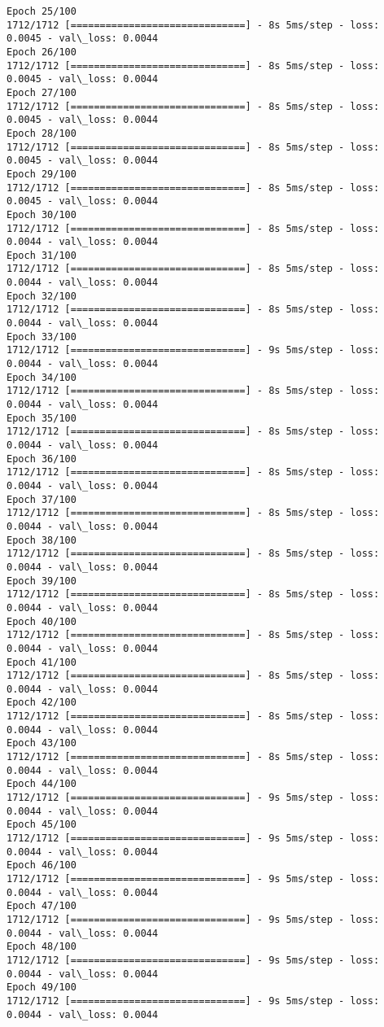 \documentclass[11pt]{article}
\begin{document}
\begin{Verbatim}[commandchars=\\\{\}]
Epoch 25/100
1712/1712 [==============================] - 8s 5ms/step - loss: 0.0045 - val\_loss: 0.0044
Epoch 26/100
1712/1712 [==============================] - 8s 5ms/step - loss: 0.0045 - val\_loss: 0.0044
Epoch 27/100
1712/1712 [==============================] - 8s 5ms/step - loss: 0.0045 - val\_loss: 0.0044
Epoch 28/100
1712/1712 [==============================] - 8s 5ms/step - loss: 0.0045 - val\_loss: 0.0044
Epoch 29/100
1712/1712 [==============================] - 8s 5ms/step - loss: 0.0045 - val\_loss: 0.0044
Epoch 30/100
1712/1712 [==============================] - 8s 5ms/step - loss: 0.0044 - val\_loss: 0.0044
Epoch 31/100
1712/1712 [==============================] - 8s 5ms/step - loss: 0.0044 - val\_loss: 0.0044
Epoch 32/100
1712/1712 [==============================] - 8s 5ms/step - loss: 0.0044 - val\_loss: 0.0044
Epoch 33/100
1712/1712 [==============================] - 9s 5ms/step - loss: 0.0044 - val\_loss: 0.0044
Epoch 34/100
1712/1712 [==============================] - 8s 5ms/step - loss: 0.0044 - val\_loss: 0.0044
Epoch 35/100
1712/1712 [==============================] - 8s 5ms/step - loss: 0.0044 - val\_loss: 0.0044
Epoch 36/100
1712/1712 [==============================] - 8s 5ms/step - loss: 0.0044 - val\_loss: 0.0044
Epoch 37/100
1712/1712 [==============================] - 8s 5ms/step - loss: 0.0044 - val\_loss: 0.0044
Epoch 38/100
1712/1712 [==============================] - 8s 5ms/step - loss: 0.0044 - val\_loss: 0.0044
Epoch 39/100
1712/1712 [==============================] - 8s 5ms/step - loss: 0.0044 - val\_loss: 0.0044
Epoch 40/100
1712/1712 [==============================] - 8s 5ms/step - loss: 0.0044 - val\_loss: 0.0044
Epoch 41/100
1712/1712 [==============================] - 8s 5ms/step - loss: 0.0044 - val\_loss: 0.0044
Epoch 42/100
1712/1712 [==============================] - 8s 5ms/step - loss: 0.0044 - val\_loss: 0.0044
Epoch 43/100
1712/1712 [==============================] - 8s 5ms/step - loss: 0.0044 - val\_loss: 0.0044
Epoch 44/100
1712/1712 [==============================] - 9s 5ms/step - loss: 0.0044 - val\_loss: 0.0044
Epoch 45/100
1712/1712 [==============================] - 9s 5ms/step - loss: 0.0044 - val\_loss: 0.0044
Epoch 46/100
1712/1712 [==============================] - 9s 5ms/step - loss: 0.0044 - val\_loss: 0.0044
Epoch 47/100
1712/1712 [==============================] - 9s 5ms/step - loss: 0.0044 - val\_loss: 0.0044
Epoch 48/100
1712/1712 [==============================] - 9s 5ms/step - loss: 0.0044 - val\_loss: 0.0044
Epoch 49/100
1712/1712 [==============================] - 9s 5ms/step - loss: 0.0044 - val\_loss: 0.0044

\end{Verbatim}
\end{document}
